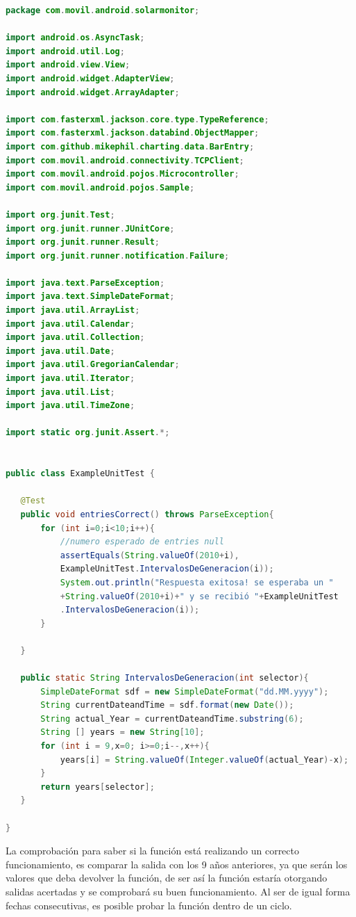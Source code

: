 \begin{lstlisting}[language= Java, frame=single]
package com.movil.android.solarmonitor;

import android.os.AsyncTask;
import android.util.Log;
import android.view.View;
import android.widget.AdapterView;
import android.widget.ArrayAdapter;

import com.fasterxml.jackson.core.type.TypeReference;
import com.fasterxml.jackson.databind.ObjectMapper;
import com.github.mikephil.charting.data.BarEntry;
import com.movil.android.connectivity.TCPClient;
import com.movil.android.pojos.Microcontroller;
import com.movil.android.pojos.Sample;

import org.junit.Test;
import org.junit.runner.JUnitCore;
import org.junit.runner.Result;
import org.junit.runner.notification.Failure;

import java.text.ParseException;
import java.text.SimpleDateFormat;
import java.util.ArrayList;
import java.util.Calendar;
import java.util.Collection;
import java.util.Date;
import java.util.GregorianCalendar;
import java.util.Iterator;
import java.util.List;
import java.util.TimeZone;

import static org.junit.Assert.*;


public class ExampleUnitTest {

   @Test
   public void entriesCorrect() throws ParseException{
       for (int i=0;i<10;i++){
           //numero esperado de entries null
           assertEquals(String.valueOf(2010+i), 
           ExampleUnitTest.IntervalosDeGeneracion(i));
           System.out.println("Respuesta exitosa! se esperaba un "
           +String.valueOf(2010+i)+" y se recibió "+ExampleUnitTest
           .IntervalosDeGeneracion(i));
       }

   }

   public static String IntervalosDeGeneracion(int selector){
       SimpleDateFormat sdf = new SimpleDateFormat("dd.MM.yyyy");
       String currentDateandTime = sdf.format(new Date());
       String actual_Year = currentDateandTime.substring(6);
       String [] years = new String[10];
       for (int i = 9,x=0; i>=0;i--,x++){
           years[i] = String.valueOf(Integer.valueOf(actual_Year)-x);
       }
       return years[selector];
   }

}

\end{lstlisting}

La comprobación para saber si la función está realizando un correcto funcionamiento, es comparar la salida con los 9 años anteriores, ya que serán los valores que deba devolver la función, de ser así la función estaría otorgando salidas acertadas y se comprobará su buen funcionamiento. Al ser de igual forma fechas consecutivas, es posible probar la función dentro de un ciclo. 


